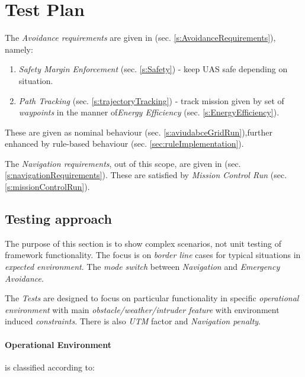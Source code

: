 \section{Test Plan} \label{s:testPlan}

\noindent The \emph{Avoidance requirements} are given in (sec. \ref{s:AvoidanceRequirements}), namely:
\begin{enumerate}
    \item\emph{Safety Margin Enforcement} (sec. \ref{s:Safety}) - keep UAS safe depending on situation.
    \item\emph{Path Tracking} (sec. \ref{s:trajectoryTracking}) - track mission given by set of \emph{waypoints} in the manner of\emph{Energy Efficiency} (sec. \ref{s:EnergyEfficiency}).
\end{enumerate}

These are given as nominal behaviour (sec. \ref{s:aviudabceGridRun}),further enhanced by rule-based behaviour (sec. \ref{sec:ruleImplementation}).

The \emph{Navigation requirements}, out of this scope, are given in (sec. \ref{s:navigationRequirements}). These are satisfied by \emph{Mission Control Run} (sec. \ref{s:missionControlRun}).


\subsection{Testing approach}\label{s:testingApproach}

\noindent The purpose of this section is to show complex scenarios, not unit testing of framework functionality. The focus is on \emph{border line} cases for typical situations in \emph{expected environment}. The \emph{mode switch} between \emph{Navigation} and \emph{Emergency Avoidance}.

\noindent The \emph{Tests} are designed to focus on particular functionality in specific \emph{operational environment} with main \emph{obstacle/weather/intruder feature} with environment induced \emph{constraints}. There is also \emph{UTM} factor and \emph{Navigation penalty}.

\paragraph{Operational Environment} is classified according to:

